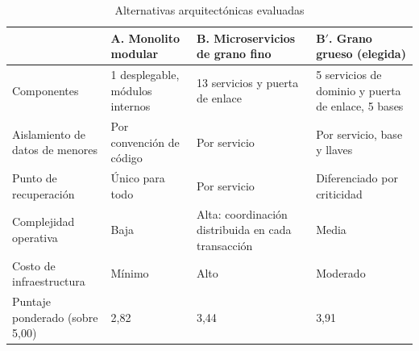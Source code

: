 \begin{table}[htbp]
\centering
\caption{Alternativas arquitectónicas evaluadas}
\label{tab:alternativas}
\small
\begin{tabular}{@{}p{2.6cm}p{3.5cm}p{3.5cm}p{4.1cm}@{}}
\toprule
& \textbf{A. Monolito modular} & \textbf{B. Microservicios de grano fino} & \textbf{B$'$. Grano grueso (elegida)} \\
\midrule
Componentes & 1 desplegable, módulos internos & 13 servicios y puerta de enlace & 5 servicios de dominio y puerta de enlace, 5 bases \\
\addlinespace
Aislamiento de datos de menores & Por convención de código & Por servicio & Por servicio, base y llaves \\
\addlinespace
Punto de recuperación & Único para todo & Por servicio & Diferenciado por criticidad \\
\addlinespace
Complejidad operativa & Baja & Alta: coordinación distribuida en cada transacción & Media \\
\addlinespace
Costo de infraestructura & Mínimo & Alto & Moderado \\
\addlinespace
Puntaje ponderado (sobre 5,00) & 2,82 & 3,44 & 3,91 \\
\bottomrule
\end{tabular}
\end{table}

